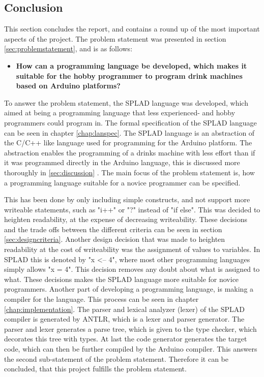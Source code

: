 \subsection{Conclusion}
This section concludes the report, and contains a round up of the most important aspects of the project.
The problem statement was presented in section \ref{sec:problemstatement}, and is as follows: 
\begin{itemize}
	\item \textbf{How can a programming language be developed, which makes it suitable for the hobby programmer to program drink machines based on Arduino platforms?}
\end{itemize}

To answer the problem statement, the SPLAD language was developed, which aimed at being a programming language that less experienced- and hobby programmers could program in. The formal specification of the SPLAD language can be seen in chapter \ref{chap:lanspec}. The SPLAD language is an abstraction of the C/C++ like language used for programming for the Arduino platform. The abstraction enables the programming of a drinks machine with less effort than if it was programmed directly in the Arduino language, this is discussed more thoroughly in \ref{sec:discussion} . The main focus of the problem statement is, how a programming language suitable for a novice programmer can be specified.

This has been done by only including simple constructs, and not support more writeable statements, such as "i++" or "?" instead of "if else". This was decided to heighten readability, at the expense of decreasing writeability. These decisions and the trade offs between the different criteria can be seen in section \ref{sec:designcriteria}. Another design decision that was made to heighten readability at the cost of writeability was the assignment of values to variables. In SPLAD this is denoted by "x <-- 4", where most other programming languages simply allows "x = 4". This decision removes any doubt about what is assigned to what. These decisions makes the SPLAD language more suitable for novice programmers.
Another part of developing a programming language, is making a compiler for the language. This process can be seen in chapter \ref{chap:implementation}. The parser and lexical analyzer (lexer) of the SPLAD compiler is generated by ANTLR, which is a lexer and parser generator. The parser and lexer generates a parse tree, which is given to the type checker, which decorates this tree with types. At last the code generator generates the target code, which can then be further compiled by the Arduino compiler. This answers the second sub-statement of the problem statement. Therefore it can be concluded, that this project fulfills the problem statement. 